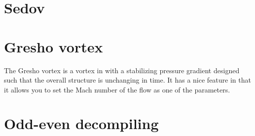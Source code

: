 \section{Sedov}



\section{Gresho vortex}

The Gresho vortex is a vortex in with a stabilizing pressure gradient
designed such that the overall structure is unchanging in time.  It
has a nice feature in that it allows you to set the Mach number of
the flow as one of the parameters.


\section{Odd-even decompiling}


